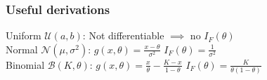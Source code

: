 \begin{mdframed}[style=eqbox]
  \subsubsection{Useful derivations}
  Uniform $\mathcal{U}(a,b)$: Not differentiable $\implies$ no $I_F(\theta)$\\[0.25em]
  Normal $\mathcal{N}(\mu, \sigma^2)$: $g(x,\theta) = \frac{x - \theta}{\sigma^2}$ $I_F(\theta) = \frac{1}{\sigma^2}$\\[0.25em]
  Binomial $\mathcal{B}(K, \theta)$: $g(x,\theta) = \frac{x}{\theta} - \frac{K-x}{1-\theta}$ $I_F(\theta) = \frac{K}{\theta(1-\theta)}$\\[0.25em]
\end{mdframed}

\begin{mdframed}[style=eqbox]

\end{mdframed}
